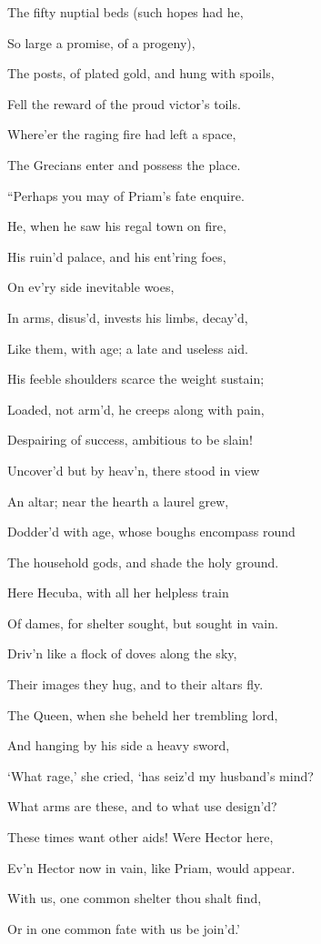 The fifty nuptial beds (such hopes had he,

So large a promise, of a progeny),

The posts, of plated gold, and hung with spoils,

Fell the reward of the proud victor’s toils.

Where’er the raging fire had left a space,

The Grecians enter and possess the place.

“Perhaps you may of Priam’s fate enquire.

He, when he saw his regal town on fire,

His ruin’d palace, and his ent’ring foes,

On ev’ry side inevitable woes,

In arms, disus’d, invests his limbs, decay’d,

Like them, with age; a late and useless aid.

His feeble shoulders scarce the weight sustain;

Loaded, not arm’d, he creeps along with pain,

Despairing of success, ambitious to be slain!

Uncover’d but by heav’n, there stood in view

An altar; near the hearth a laurel grew,

Dodder’d with age, whose boughs encompass round

The household gods, and shade the holy ground.

Here Hecuba, with all her helpless train

Of dames, for shelter sought, but sought in vain.

Driv’n like a flock of doves along the sky,

Their images they hug, and to their altars fly.

The Queen, when she beheld her trembling lord,

And hanging by his side a heavy sword,

‘What rage,’ she cried, ‘has seiz’d my husband’s mind?

What arms are these, and to what use design’d?

These times want other aids! Were Hector here,

Ev’n Hector now in vain, like Priam, would appear.

With us, one common shelter thou shalt find,

Or in one common fate with us be join’d.’

